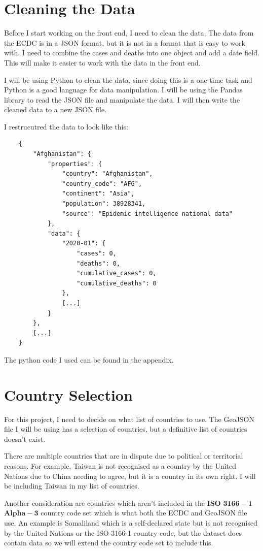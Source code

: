 \documentclass{report}
\begin{document}
\newpage
\section{Cleaning the Data}
Before I start working on the front end, I need to clean the data. The data from the ECDC is in a JSON format, but it is not in a format that is easy to work with. I need to combine the cases and deaths into one object and add a date field. This will make it easier to work with the data in the front end.

I will be using Python to clean the data, since doing this is a one-time task and Python is a good language for data manipulation. I will be using the Pandas library to read the JSON file and manipulate the data. I will then write the cleaned data to a new JSON file.

I restrucutred the data to look like this:
\begin{center}
    \begin{lstlisting}
    {
        "Afghanistan": {
            "properties": {
                "country": "Afghanistan",
                "country_code": "AFG",
                "continent": "Asia",
                "population": 38928341,
                "source": "Epidemic intelligence national data"
            },
            "data": {
                "2020-01": {
                    "cases": 0,
                    "deaths": 0,
                    "cumulative_cases": 0,
                    "cumulative_deaths": 0
                },
                [...]
            }
        },
        [...]
    }
    \end{lstlisting}
\end{center}
The python code I used can be found in the appendix.

\section{Country Selection}
For this project, I need to decide on what list of countries to use. The GeoJSON file I will be using has a selection of countries, but a definitive list of countries doesn't exist.

There are multiple countries that are in dispute due to political or territorial reasons. For example, Taiwan is not recognised as a country by the United Nations due to China needing to agree, but it is a country in its own right. I will be including Taiwan in my list of countries.

Another consideration are countries which aren't included in the $\mathbf{ISO}$ $\mathbf{3166-1}$ $\mathbf{Alpha-3}$ country code set which is what both the ECDC and GeoJSON file use. An example is Somaliland which is a self-declared state but is not recognised by the United Nations or the ISO-3166-1 country code, but the dataset does contain data so we will extend the country code set to include this.
\end{document}
